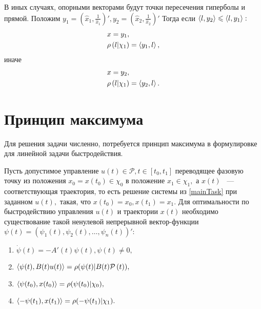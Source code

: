 \documentclass[11pt]{article}
\begin{document}
В иных случаях, опорными векторами будут точки пересечения гиперболы и прямой. 
Положим $y_1 = \left(\hat x_1, \frac{1}{\hat x_1} \right)',
y_2 = \left(\hat x_2, \frac{1}{\hat x_2} \right)'$
Тогда если $\left<l,y_2\right> \leqslant \left<l,y_1\right>:$
\[
\begin{aligned}
&x = y_1,
\\
& \rho\left(l | \chi_1  \right) = \left<y_1,l\right>,
\end{aligned}
\]
иначе
\[
\begin{aligned}
& x = y_2,
\\
& \rho\left(l | \chi_1  \right) = \left<y_2,l\right>.
\end{aligned}
\]

\section{Принцип максимума}
Для решения задачи численно, потребуется принцип максимума в формулировке для линейной задачи быстродействия.
\begin{theorem}\label{PMP}

Пусть допустимое управление $u(t) \in \mathcal{P}, t \in \left[t_0, t_1    \right]$ 
переводящее фазовую точку из положения $x_0 = x(t_0) \in \chi_0$ в положение $x_1 \in \chi_1,$
а $x(t)$ ~--- соответствующая траектория, то есть решение системы из \eqref{mainTask} при заданном $u(t),$
такая, что $x(t_0) = x_0, x(t_1) = x_1.$ Для оптимальности по быстродействию управления $u(t)$
и траектории $x(t)$ необходимо существование такой ненулевой непрерывной вектор-функции
$\psi(t) = (\psi_1(t), \psi_2(t), \dots, \psi_n(t))':$
\begin{enumerate}
\item $ \dot \psi(t) = -A'(t)\psi(t), \psi(t) \ne 0,$
\item $\left<\psi(t),B(t)u(t)\right> = \rho(\psi(t)| B(t) \mathcal{P}\left(t\right)), $
\item $\left<\psi(t_0),x(t_0)\right> = \rho(\psi(t_0) | \chi_0),$
\item $\left<-\psi (t_1),x(t_1)\right> = \rho(-\psi(t_1) | \chi_1).$
\end{enumerate}
\end{theorem}
\end{document}
